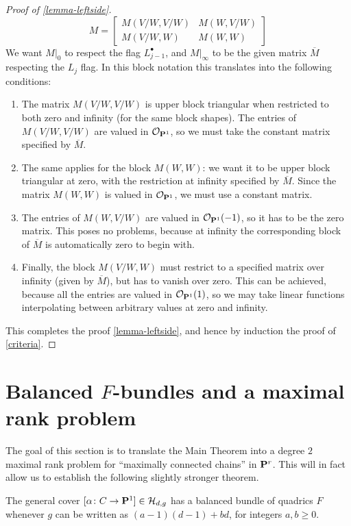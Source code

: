 \documentclass[11pt, two side, letterpaper, final]{amsart}
\renewcommand{\P}{{\bf P}}
\newcommand {\from}{\colon}
\begin{document}
\begin{proof}[Proof of \cref{lemma-leftside}]
\[
M = 
\left[
\begin{array}{c|c}
M(V/W,V/W) & M(W,V/W) \\ \hline
M(V/W,W) & M(W,W)
\end{array}	
\right]
\]
We want $M|_0$ to respect the flag $L^\bullet_{j-1}$, and $M|_\infty$ to be the given matrix $\overline{M}$ respecting the $L_j$ flag. In this block notation this
translates into the following conditions:
\begin{enumerate}
	\item The matrix $M(V/W,V/W)$ is upper block triangular when restricted to both zero and infinity (for the same block shapes). The entries of
	$M(V/W,V/W)$ are valued in $\sh{O}_{\P^1}$, so we must take the constant matrix specified by $\overline{M}$.
	\item The same applies for the block $M(W,W)$: we want it to be upper block triangular at zero, with the restriction at infinity specified by $\overline{M}$.  Since the matrix $M(W,W)$ is valued in $\sh{O}_{\P^1}$, we must use a constant matrix.
	\item The entries of $M(W,V/W)$ are valued in $\sh{O}_{\P^1}(-1)$, so it has to be the zero matrix. This poses no problems, because at infinity the
	corresponding block of $\overline{M}$ is automatically zero to begin with.
	\item Finally, the block $M(V/W,W)$ must restrict to a specified matrix  over infinity (given by $\overline{M}$), but has to vanish over zero. This can be
	achieved, because all the entries are valued in $\sh{O}_{\P^1}(1)$, so we may take linear functions interpolating between arbitrary values 
	at zero and infinity.
\end{enumerate}

This completes the proof \cref{lemma-leftside}, and hence by induction the proof of \cref{criteria}.
\end{proof}






 

\section{Balanced \texorpdfstring{$F$}{F}-bundles and a maximal rank problem}
\label{sec:reduction}
The goal of this section is to translate the Main Theorem into a degree $2$ maximal rank problem for ``maximally connected chains'' in $\P^{r}$. This
will in fact allow us to establish the following slightly stronger theorem.
\begin{theorem}
\label{theorem:F-bundle}
The general cover $[\alpha\from C \to \P^1] \in \mathcal{H}_{d,g}$ has a balanced bundle of quadrics $F$ whenever $g$ can be written as $(a-1)(d-1)+bd$, for integers $a,b \geq 0$.
\end{theorem}
\end{document}
